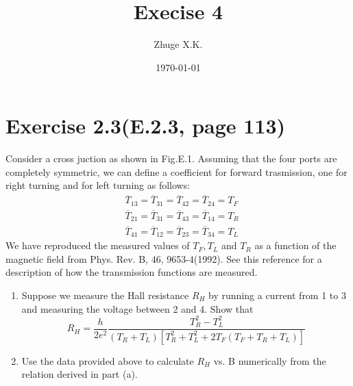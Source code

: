 \documentclass[11pt,a4paper]{article}
\title{Execise 4}
\author{Zhuge X.K.}
\date{\today}
\theoremstyle{plain}
\theoremstyle{definition}
\theoremstyle{remark}
\begin{document}
\maketitle
\section*{Exercise 2.3(E.2.3, page 113)}
Consider a cross juction as shown in Fig.E.1. Assuming that the four ports are completely symmetric, we can define a coefficient for forward trasmission, one for right turning and for left turning as follows:
\begin{equation*}
    \begin{aligned}
        & \overline{T}_{13} = \overline{T}_{31} = \overline{T}_{42} = \overline{T}_{24} = T_F \\
        & \overline{T}_{21} = \overline{T}_{31} = \overline{T}_{43} = \overline{T}_{14} = T_R \\
        & \overline{T}_{41} = \overline{T}_{12} = \overline{T}_{23} = \overline{T}_{34} = T_L
    \end{aligned}
\end{equation*}
We have reproduced the measured values of $T_F, T_L$ and $T_R$ as a function of the magnetic field from Phys. Rev. B, 46, 9653-4(1992). See this reference for a description of how the transmission functions are measured.
\begin{enumerate}[label=(\alph*)]
    \item Suppose we measure the Hall resistance $R_H$ by running a current from 1 to 3 and measuring the voltage between 2 and 4. Show that
    \begin{equation*}
        R_H = \frac{h}{2e^2}\frac{T_R^2 - T_L^2}{(T_R + T_L)[T_R^2 + T_L^2 + 2T_F(T_F + T_R + T_L)]}
    \end{equation*}
    \item Use the data provided above to calculate $R_H$ vs. B numerically from the relation derived in part (a).
\end{enumerate}
\end{document}
